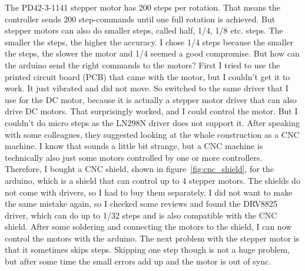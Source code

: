 \noindent The PD42-3-1141 stepper motor has 200 steps per rotation.
That means the controller sends 200 step-commands until one full rotation is achieved.
But stepper motors can also do smaller steps, called half, 1/4, 1/8 etc. steps.
The smaller the steps, the higher the accuracy.
I chose 1/4 steps because the smaller the steps, the slower the motor and 1/4 seemed a good compromise.
But how can the arduino send the right commands to the motors?
First I tried to use the printed circuit board (PCB) that came with the motor, but I couldn't get it to work.
It just vibrated and did not move.
So switched to the same driver that I use for the DC motor, because it is actually a stepper motor driver that can also drive DC motors.
That surprisingly worked, and I could control the motor.
But I couldn't do micro steps as the LN298N driver does not support it.
After speaking with some colleagues, they suggested looking at the whole construction as a CNC machine.
I know that sounds a little bit strange, but a CNC machine is technically also just some motors controlled by one or more controllers.
Therefore, I bought a CNC shield\autocite{cnc-shield}, shown in figure~\ref{fig:cnc_shield}, for the arduino, which is a shield that can control up to 4 stepper motors.
The shields do not come with drivers, so I had to buy them separately.
I did not want to make the same mistake again, so I checked some reviews and found the DRV8825\autocite{drv8825} driver, which can do up to 1/32 steps and is also compatible with the CNC shield.
After some soldering and connecting the motors to the shield, I can now control the motors with the arduino.
The next problem with the stepper motor is that it sometimes skips steps.
Skipping one step though is not a huge problem, but after some time the small errors add up and the motor is out of sync.


